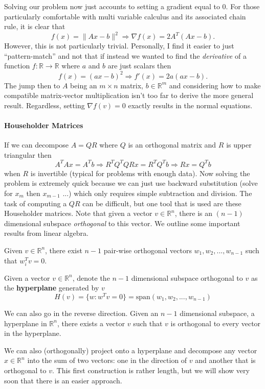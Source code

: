 \documentclass[11pt]{article}
\numberwithin{equation}{section}
\newcommand{\R}{\mathbb{R}}
\begin{document}
Solving our problem now just accounts to setting a gradient equal to $0$. For those particularly comfortable with multi variable calculus and its associated chain rule, it is clear that $$f(x) = \|Ax-b\|^2 \Longrightarrow \nabla f(x) = 2A^T(Ax-b).$$  
However, this is not particularly trivial. Personally, I find it easier to just ``pattern-match'' and not that if instead we wanted to find the \textit{derivative} of a function $f: \R \to \R$ where $a$ and $b$ are just scalars then $$f(x) = (ax-b)^2 \Longrightarrow f'(x) = 2a(ax-b).$$
The jump then to $A$ being an $m \times n$ matrix, $b \in \R^m$ and considering how to make compatible matrix-vector multiplication isn't too far to derive the more general result. Regardless, setting $\nabla f(v) = 0$ exactly results in the normal equations.

\paragraph{Householder Matrices}
If we can decompose $A = QR$ where $Q$ is an orthogonal matrix and $R$ is upper triangular then $$A^TA x = A^Tb \Longrightarrow R^TQ^TQRx = R^TQ^Tb \Longrightarrow Rx = Q^Tb$$
when $R$ is invertible (typical for problems with enough data). Now solving the problem is extremely quick because we can just use backward substitution (solve for $x_m$ then $x_{m-1}$ ...) which only requires simple subtraction and division. The task of computing a $QR$ can be difficult, but one tool that is used are these Householder matrices. Note that given a vector $v \in \R^n$, there is an $(n-1)$ dimensional subspace \textit{orthogonal} to this vector. We outline some important results from linear algebra. 
\begin{lemma}{}{}
Given $v \in \R^n$, there exist $n-1$ pair-wise orthogonal vectors $w_1, w_2, ..., w_{n-1}$ such that $w_i^T v = 0$. 
\end{lemma}
\begin{definition}{}{}
    Given a vector $v \in \R^n$, denote the $n-1$ dimensional subspace orthogonal to $v$ as the \textbf{hyperplane} generated by $v$ $$H(v) = \{w : w^Tv = 0\} = \mathrm{span}(w_1, w_2, ..., w_{n-1})$$
\end{definition}
We can also go in the reverse direction. Given an $n-1$ dimensional subspace, a hyperplane in $\R^n$, there exists a vector $v$ such that $v$ is orthogonal to every vector in the hyperplane. 

We can also (orthogonally) project onto a hyperplane and decompose any vector $x \in \R^n$ into the sum of two vectors: one in the direction of $v$ and another that is orthogonal to $v$. This first construction is rather length, but we will show very soon that there is an easier approach.
\end{document}
